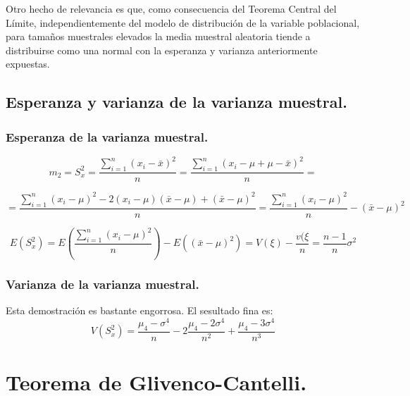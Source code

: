 Otro hecho de relevancia es que, como consecuencia del Teorema Central del L\'imite, independientemente del modelo de distribuci\'on
de la variable poblacional, para tama\~nos muestrales elevados la media muestral aleatoria tiende a distribuirse como una normal con la esperanza y varianza anteriormente expuestas.

\subsection{Esperanza y varianza de la varianza muestral.}

\subsubsection{Esperanza de la varianza muestral.}

\begin{equation*}
m_2=S_x^2=\dfrac{\sum_{i=1}^n\left(x_i-\bar{x}\right)^2}{n}=\dfrac{\sum_{i=1}^n\left(x_i-\mu+\mu-\bar{x}\right)^2}{n}=
\end{equation*}

\begin{equation*}
=\dfrac{\sum_{i=1}^n\left(x_i-\mu\right)^2-2\left(x_i-\mu\right)\left(\bar{x}-\mu\right)+\left(\bar{x}-\mu\right)^2}{n}=\dfrac{\sum_{i=1}^n\left(x_i-\mu\right)^2}{n}-\left(\bar{x}-\mu\right)^2
\end{equation*}

\begin{equation*}
E\left(S_x^2\right)=E\left(\dfrac{\sum_{i=1}^n\left(x_i-\mu\right)^2}{n}\right)-E\left(\left(\bar{x}-\mu\right)^2\right)=V(\xi)-\dfrac{v(\xi}{n}=\dfrac{n-1}{n}\sigma^2
\end{equation*}

\subsubsection{Varianza de la varianza muestral.}

Esta demostraci\'on es bastante engorrosa. El sesultado fina es:
\begin{equation*}
V\left(S_x^2\right)=\dfrac{\mu_4-\sigma^4}{n}-2\dfrac{\mu_4-2\sigma^4}{n^2}+\dfrac{\mu_4-3\sigma^4}{n^3}
\end{equation*}

\section{Teorema de Glivenco-Cantelli.}

